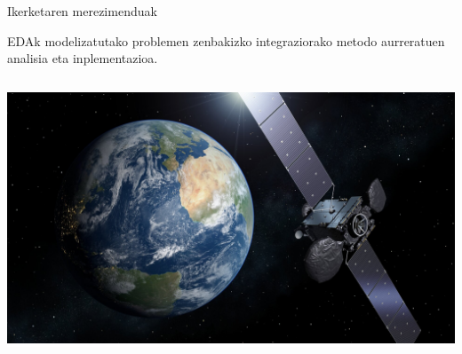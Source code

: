 \documentclass[
 10pt,%
 compress,%
 t,       %
 xcolor=svgnames
]{beamer}
\theoremstyle{definition} \newtheorem{definicion}{Definicion}[section]
\theoremstyle{propiedades} \newtheorem{propiedades}{Propiedades}[section]
\begin{document}

\begin{frame}[fragile]{Ikerketaren merezimenduak} 					  







\small

\centering EDAk modelizatutako problemen zenbakizko integraziorako metodo aurreratuen analisia eta inplementazioa.

\medskip



%
%
%
%
%
\begin{columns}
%	
%
\tiny
%

\centering
\begin{minipage}{.8\textwidth}
	\colorbox{white} 
	 {\includegraphics[width=0.8\linewidth]{SmallGEO_Hispasat_36W-1_pillars}}
\end{minipage}


\end{columns}
\end{frame}
\end{document}
